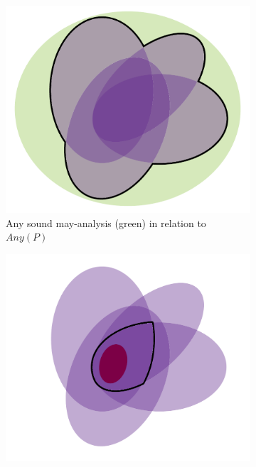 \begin{figure}[htb!]
\begin{subfigure}{.47\textwidth}
    \label{fig:back:soundness-b}
\end{subfigure}
\begin{subfigure}{.47\textwidth}
    \includegraphics[scale=.45]{assets/background/venn-soundness-c.pdf}
    \caption{Any sound may-analysis (green) in relation to $Any(P)$}
    \label{fig:back:soundness-c}
\end{subfigure}
\hfill
\begin{subfigure}{.47\textwidth}
    \includegraphics[scale=.45]{assets/background/venn-soundness-d.pdf}

\end{subfigure}
\end{figure}
